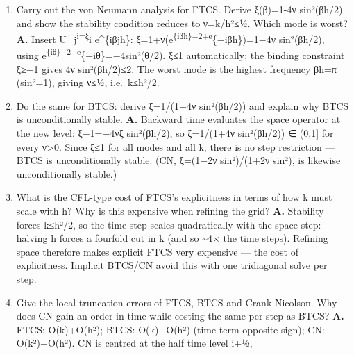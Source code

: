 \documentclass[
  11pt,
]{article}
\begin{document}
\begin{enumerate}
  Write the FTCS stencil for u\_t=u\_xx, the explicit update, and the
  matrix form U\^{}\{i+1\}=F U\textsuperscript{i+p}i. Why do boundary
  terms appear only in the first and last entries of p\^{}i? \textbf{A.}
  Forward time, central space:
  (U\_j\textsuperscript{\{i+1\}−U\_j}i)/k=(U\_\{j+1\}\textsuperscript{i−2U\_j}i+U\_\{j−1\}\^{}i)/h²,
  so
  U\_j\textsuperscript{\{i+1\}=νU\_\{j+1\}}i+(1−2ν)U\_j\textsuperscript{i+νU\_\{j−1\}}i
  with ν=k/h². In matrix form U\textsuperscript{\{i+1\}=FU}i+p\^{}i,
  F=tridiag(ν,1−2ν,ν), p\^{}i=(νa, 0,\ldots,0, νb)\^{}T. Boundary terms
  enter only the first and last entries because only the stencils at j=1
  and j=N\_x−1 reach into the known boundary nodes U\_0, U\_\{N\_x\}.
\item
  Carry out the von Neumann analysis for FTCS. Derive ξ(β)=1-4ν
  sin²(βh/2) and show the stability condition reduces to ν=k/h²≤½. Which
  mode is worst? \textbf{A.} Insert U\_j\textsuperscript{i=ξ}i
  e\^{}\{iβjh\}: ξ=1+ν(e\textsuperscript{\{iβh\}−2+e}\{−iβh\})=1−4ν
  sin²(βh/2), using e\textsuperscript{\{iθ\}−2+e}\{−iθ\}=−4sin²(θ/2).
  ξ≤1 automatically; the binding constraint ξ≥−1 gives 4ν sin²(βh/2)≤2.
  The worst mode is the highest frequency βh=π (sin²=1), giving ν≤½,
  i.e.~k≤h²/2.
\item
  Do the same for BTCS: derive ξ=1/(1+4ν sin²(βh/2)) and explain why
  BTCS is unconditionally stable. \textbf{A.} Backward time evaluates
  the space operator at the new level: ξ−1=−4νξ sin²(βh/2), so ξ=1/(1+4ν
  sin²(βh/2)) ∈ (0,1{]} for every ν\textgreater0. Since
  \textbar ξ\textbar≤1 for all modes and all k, there is no step
  restriction --- BTCS is unconditionally stable. (CN, ξ=(1−2ν
  sin²)/(1+2ν sin²), is likewise unconditionally stable.)
\item
  What is the CFL-type cost of FTCS's explicitness in terms of how k
  must scale with h? Why is this expensive when refining the grid?
  \textbf{A.} Stability forces k≤h²/2, so the time step scales
  quadratically with the space step: halving h forces a fourfold cut in
  k (and so \textasciitilde4× the time steps). Refining space therefore
  makes explicit FTCS very expensive --- the cost of explicitness.
  Implicit BTCS/CN avoid this with one tridiagonal solve per step.
\item
  Give the local truncation errors of FTCS, BTCS and Crank-Nicolson. Why
  does CN gain an order in time while costing the same per step as BTCS?
  \textbf{A.} FTCS: O(k)+O(h²); BTCS: O(k)+O(h²) (time term opposite
  sign); CN: O(k²)+O(h²). CN is centred at the half time level i+½,

\end{enumerate}
\end{document}
